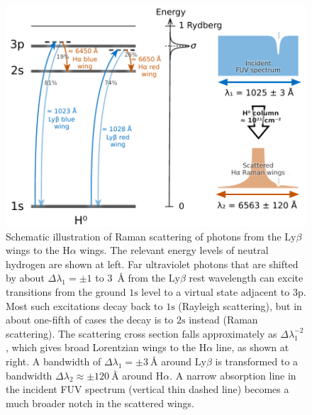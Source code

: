 \documentclass[useAMS, usenatbib, a4paper]{mnras}
\newcommand\Config[1]{\ensuremath{\mathrm{#1}}}
\newcommand\ha{\ensuremath{\text{H}\alpha}}
\newcommand\lyb{\ensuremath{\text{Ly}\beta}}
\begin{document}
\begin{figure}
  \centering
  \includegraphics[width=\linewidth]{figs/raman-cartoon}
  \caption{Schematic illustration of Raman scattering of photons from
    the \lyb{} wings to the \ha{} wings.  The relevant energy levels
    of neutral hydrogen are shown at left.  Far ultraviolet photons
    that are shifted by about \(\Delta\lambda_1 = \pm 1\) to \SI{3}{\angstrom}
    from the \lyb{} rest wavelength can excite transitions from the
    ground \Config{1s} level to a virtual state adjacent to
    \Config{3p}.  Most such excitations decay back to \Config{1s}
    (Rayleigh scattering), but in about one-fifth of cases the decay
    is to \Config{2s} instead (Raman scattering).  The scattering
    cross section falls approximately as \(\Delta\lambda_1^{-2}\), which gives
    broad Lorentzian wings to the \ha{} line, as shown at right. A
    bandwidth of \(\Delta\lambda_1 = \pm \SI{3}{\angstrom}\) around \lyb{} is
    transformed to a bandwidth
    \(\Delta\lambda_2 \approx \pm \SI{120}{\angstrom}\) around \ha{}.  A narrow
    absorption line in the incident FUV spectrum (vertical thin dashed
    line) becomes a much broader notch in the scattered wings. }
  \label{fig:raman-cartoon}
\end{figure}
\end{document}
